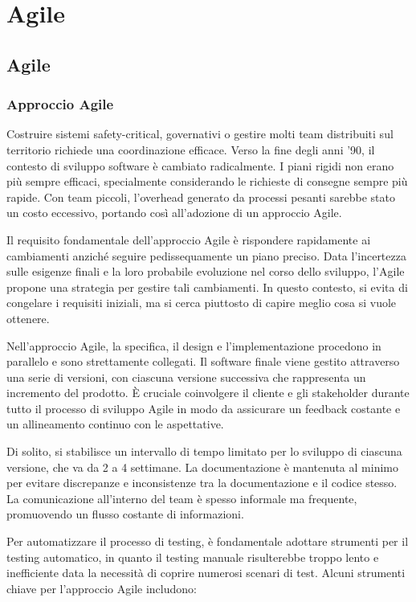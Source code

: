\chapter{Agile}
\section{Agile}
\subsection{Approccio Agile}
Costruire sistemi safety-critical, governativi o gestire molti team distribuiti sul territorio richiede una
coordinazione efficace. Verso la fine degli anni '90, il contesto di sviluppo software è cambiato radicalmente.
I piani rigidi non erano più sempre efficaci, specialmente considerando le richieste di consegne sempre più rapide.
Con team piccoli, l'overhead generato da processi pesanti sarebbe stato un costo eccessivo, portando così all'adozione
di un approccio Agile.

Il requisito fondamentale dell'approccio Agile è rispondere rapidamente ai cambiamenti anziché seguire pedissequamente
un piano preciso. Data l'incertezza sulle esigenze finali e la loro probabile evoluzione nel corso dello sviluppo,
l'Agile propone una strategia per gestire tali cambiamenti. In questo contesto, si evita di congelare i requisiti
iniziali, ma si cerca piuttosto di capire meglio cosa si vuole ottenere.

Nell'approccio Agile, la specifica, il design e l'implementazione procedono in parallelo e sono strettamente collegati.
Il software finale viene gestito attraverso una serie di versioni, con ciascuna versione successiva che rappresenta un
incremento del prodotto. È cruciale coinvolgere il cliente e gli stakeholder durante tutto il processo di sviluppo Agile
in modo da assicurare un feedback costante e un allineamento continuo con le aspettative.

Di solito, si stabilisce un intervallo di tempo limitato per lo sviluppo di ciascuna versione, che va da 2 a 4 settimane.
La documentazione è mantenuta al minimo per evitare discrepanze e inconsistenze tra la documentazione e il codice stesso.
La comunicazione all'interno del team è spesso informale ma frequente, promuovendo un flusso costante di informazioni.

Per automatizzare il processo di testing, è fondamentale adottare strumenti per il testing automatico, in quanto il testing
manuale risulterebbe troppo lento e inefficiente data la necessità di coprire numerosi scenari di test. Alcuni strumenti
chiave per l'approccio Agile includono:

